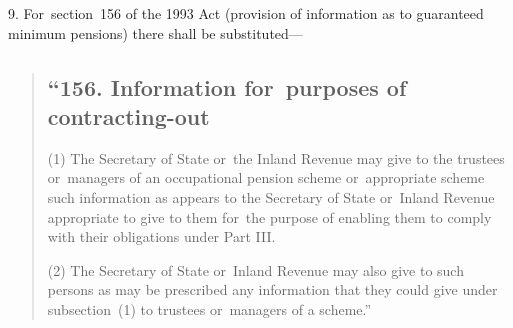 \documentclass[12pt,a4paper]{article}
\begin{document}
9. For~section~156 of the 1993 Act (provision of information as to guaranteed minimum pensions) there shall be substituted—
\begin{quotation}
\subsection*{“156. Information for~purposes of contracting-out}

(1) The Secretary of State or~the Inland Revenue may give to the trustees or~managers of an occupational pension scheme or~appropriate scheme such information as appears to the Secretary of State or~Inland Revenue appropriate to give to them for~the purpose of enabling them to comply with their obligations under Part III.

(2) The Secretary of State or~Inland Revenue may also give to such persons as may be prescribed any information that they could give under subsection~(1)  to trustees or~managers of a scheme.”
\end{quotation}
\end{document}
